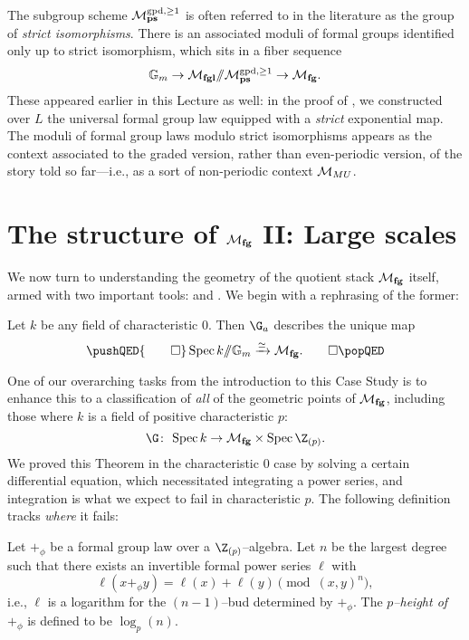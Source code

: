 \begin{remark}\label{StrictIsosRemark}
The subgroup scheme \(\mathcal{M}_{\mathbf{ps}}^{\mathrm{gpd}, \ge 1}\) is often referred to in the literature as the group of \textit{strict isomorphisms}.  There is an associated moduli of formal groups identified only up to strict isomorphism, which sits in a fiber sequence \[\mathbb G_m \to \mathcal{M}_{\mathbf{fgl}} /\!\!/ \mathcal{M}_{\mathbf{ps}}^{\mathrm{gpd}, \ge 1} \to \mathcal{M}_{\mathbf{fg}}.\]  These appeared earlier in this Lecture as well: in the proof of , we constructed over \(L\) the universal formal group law equipped with a \emph{strict} exponential map.  The moduli of formal group laws modulo strict isomorphisms appears as the context associated to the graded version, rather than even-periodic version, of the story told so far---i.e., as a sort of non-periodic context \(\mathcal{M}_{MU}\).
\end{remark}











\section{The structure of \texorpdfstring{\(\mathcal{M}_{\mathbf{fg}}\)}{Mfg} II: Large scales}\label{MfgII:LargeScales}

We now turn to understanding the geometry of the quotient stack \(\mathcal{M}_{\mathbf{fg}}\) itself, armed with two important tools:  and .  We begin with a rephrasing of the former:

\begin{theorem}\label{RationalGeometricPointsOfMfg}
Let \(k\) be any field of characteristic \(0\).  Then \(\G_a\) describes the unique map
\[\pushQED{\qed}
\Spec k \mmod \Gm \xrightarrow{\simeq} \moduli{fg}. \qedhere
\popQED\]
\end{theorem}

One of our overarching tasks from the introduction to this Case Study is to enhance this to a classification of \emph{all} of the geometric points of \(\mathcal{M}_{\mathbf{fg}}\), including those where \(k\) is a field of positive characteristic \(p\): \[\G\co \Spec k \to \moduli{fg} \times \Spec \Z_{(p)}.\]  We proved this Theorem in the characteristic \(0\) case by solving a certain differential equation, which necessitated integrating a power series, and integration is what we expect to fail in characteristic \(p\).  The following definition tracks \emph{where} it fails:
\begin{definition}\label{HeightDefn}
Let \(+_\phi\) be a formal group law over a \(\Z_{(p)}\)--algebra.  Let \(n\) be the largest degree such that there exists an invertible formal power series \(\ell\) with \[\ell(x +_\phi y) = \ell(x) + \ell(y) \pmod{(x, y)^{n}},\] i.e., \(\ell\) is a logarithm for the \((n-1)\)--bud determined by \(+_\phi\).  The \textit{\(p\)--height of \(+_\phi\)} is defined to be \(\log_p(n)\).
\end{definition}

